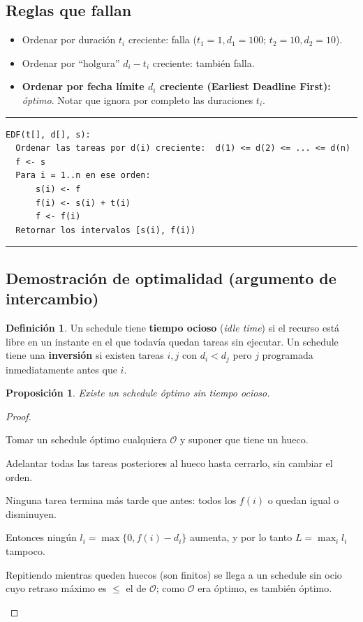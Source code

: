 \documentclass[11pt,a4paper]{article}
\theoremstyle{plain}
\newtheorem{proposicion}[teorema]{Proposición}
\theoremstyle{definition}
\newtheorem{definicion}[teorema]{Definición}
\theoremstyle{remark}
\newcommand{\codigoinicio}{\begin{center}\begin{minipage}{0.93\textwidth}%
  \hrule\vspace{3pt}}
\newcommand{\codigofin}{\vspace{-4pt}\hrule\end{minipage}\end{center}}
\begin{document}
\subsection{Reglas que fallan}
\begin{itemize}
\item Ordenar por duración $t_i$ creciente: falla ($t_1=1,d_1=100$; $t_2=10,d_2=10$).
\item Ordenar por ``holgura'' $d_i-t_i$ creciente: también falla.
\item \textbf{Ordenar por fecha límite $d_i$ creciente (Earliest Deadline First):}
\emph{óptimo}. Notar que ignora por completo las duraciones $t_i$.
\end{itemize}

\codigoinicio
\begin{verbatim}
EDF(t[], d[], s):
  Ordenar las tareas por d(i) creciente:  d(1) <= d(2) <= ... <= d(n)
  f <- s
  Para i = 1..n en ese orden:
      s(i) <- f
      f(i) <- s(i) + t(i)
      f <- f(i)
  Retornar los intervalos [s(i), f(i))
\end{verbatim}
\codigofin

\subsection{Demostración de optimalidad (argumento de intercambio)}

\begin{definicion}
Un schedule tiene \textbf{tiempo ocioso} (\emph{idle time}) si el recurso está libre en
un instante en el que todavía quedan tareas sin ejecutar. Un schedule tiene una
\textbf{inversión} si existen tareas $i,j$ con $d_i<d_j$ pero $j$ programada
inmediatamente antes que $i$.
\end{definicion}

\begin{proposicion}\label{p:ocio}
Existe un schedule óptimo sin tiempo ocioso.
\end{proposicion}
\begin{proof}
\begin{pasos}
\item Tomar un schedule óptimo cualquiera $\mathcal{O}$ y suponer que tiene un hueco.
\item Adelantar todas las tareas posteriores al hueco hasta cerrarlo, sin cambiar el
orden.
\item Ninguna tarea termina más tarde que antes: todos los $f(i)$ o quedan igual o
disminuyen.
\item Entonces ningún $l_i=\max\{0,f(i)-d_i\}$ aumenta, y por lo tanto
$L=\max_i l_i$ tampoco.
\item Repitiendo mientras queden huecos (son finitos) se llega a un schedule sin ocio
cuyo retraso máximo es $\le$ el de $\mathcal{O}$; como $\mathcal{O}$ era óptimo, es
también óptimo. \qedhere
\end{pasos}
\end{proof}
\end{document}
